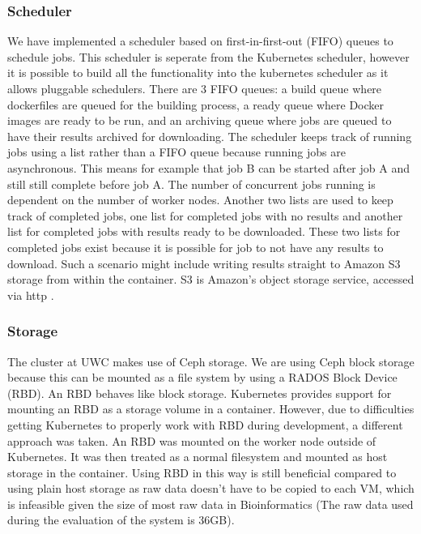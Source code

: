 \documentclass{sig-alternate-05-2015}
\begin{document}
\subsubsection{Scheduler}
We have implemented a scheduler based on first-in-first-out (FIFO) queues to schedule jobs. This scheduler is seperate from the Kubernetes scheduler, however it is possible to build all the functionality into the kubernetes scheduler as it allows pluggable schedulers. There are 3 FIFO queues: a build queue where dockerfiles are queued for the building process, a ready queue where Docker images are ready to be run, and an archiving queue where jobs are queued to have their results archived for downloading. The scheduler keeps track of running jobs using a list rather than a FIFO queue because running jobs are asynchronous. This means for example that job B can be started after job A and still still complete before job A. The number of concurrent jobs running is dependent on the number of worker nodes. Another two lists are used to keep track of completed jobs, one list for completed jobs with no results and another list for completed jobs with results ready to be downloaded. These two lists for completed jobs exist because it is possible for job to not have any results to download. Such a scenario might include writing results straight to Amazon S3 storage from within the container. S3 is Amazon's object storage service, accessed via http \cite{awss3}.


\subsubsection{Storage}
The cluster at UWC makes use of Ceph storage. We are using Ceph block storage because this can be mounted as a file system by using a RADOS Block Device (RBD). An RBD behaves like block storage. Kubernetes provides support for mounting an RBD as a storage volume in a container. However, due to difficulties getting Kubernetes to properly work with RBD during development, a different approach was taken. An RBD was mounted on the worker node outside of Kubernetes. It was then treated as a normal filesystem and mounted as host storage in the container. Using RBD in this way is still beneficial compared to using plain host storage as raw data doesn't have to be copied to each VM, which is infeasible given the size of most raw data in Bioinformatics (The raw data used during the evaluation of the system is 36GB).
\end{document}
